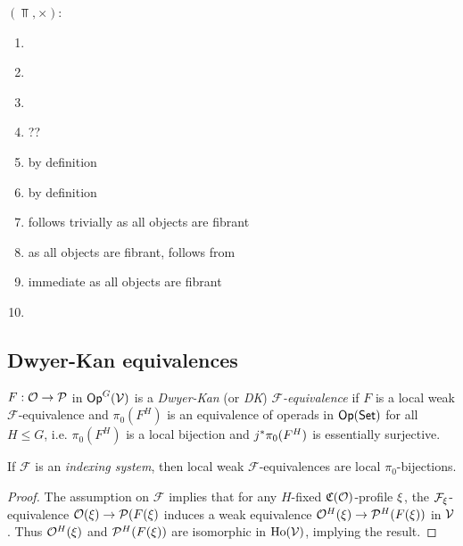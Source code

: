 \documentclass[a4paper,10pt
,draft
]{article}%
\renewcommand{\F}{\mathcal F}
\renewcommand{\1}{\ensuremath{\mathbb{id}}}
\begin{document}
\begin{example}
      $(\Top,\times)$:
      \begin{enumerate}[label = (\roman*)]
      \item \cite{Hov98}
      \item \cite{Hov98}
      \item \cite{Pia91}
      \item ??
      \item by definition
      \item by definition
      \item follows trivially as all objects are fibrant
      \item as all objects are fibrant, follows from \cite[Lemma 2.1]{BM13}
      \item immediate as all objects are fibrant
      \item 
      \end{enumerate}
\end{example}









\subsection{Dwyer-Kan equivalences}

\begin{definition}
      $F: \mathcal{O} \to \mathcal{P}$ in $\mathsf{Op}^G(\mathcal V)$ is a \textit{Dwyer-Kan} (or \textit{DK}) \textit{$\F$-equivalence} if
      $F$ is a local weak $\F$-equivalence and
      $\pi_0(F^H)$ is an equivalence of operads in $\mathsf{Op}(\mathsf{Set})$ for all $H \leq G$, i.e.
      $\pi_0(F^H)$ is a local bijection and $j^{\**}\pi_0(F^H)$ is essentially surjective.
\end{definition}

\begin{lemma}
      If $\F$ is an \textit{indexing system}, then
      local weak $\F$-equivalences are local $\pi_0$-bijections.
\end{lemma}
\begin{proof}
      The assumption on $\F$ implies that
      for any $H$-fixed $\mathfrak C(\mathcal{O})$-profile $\xi$,
      the $\F_\ksi$-equivalence $\mathcal{O}(\xi) \to \mathcal{P}(F(\xi)$ induces a weak equivalence
      $\mathcal{O}^H(\xi) \to \mathcal{P}^H(F(\xi))$ in $\mathcal V$.
      Thus $\mathcal{O}^H(\xi)$ and $\mathcal{P}^H(F(\xi))$ are isomorphic in $\operatorname{Ho}(\mathcal V)$,
      implying the result.      
\end{proof}
\end{document}
